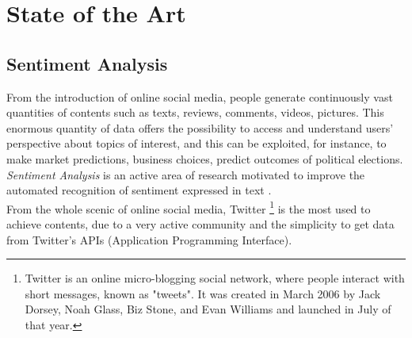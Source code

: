 
\chapter{State of the Art}






\section{Sentiment Analysis}


From the introduction of online social media, people generate continuously vast quantities of contents such as texts, reviews, comments, videos, pictures. This enormous quantity of data offers the possibility to access and understand users' perspective about topics of interest, and this can be exploited, for instance, to make market predictions, business choices, predict outcomes of political elections. \textit{Sentiment Analysis} is an active area of research motivated to improve the automated recognition of sentiment expressed in text \cite{Zimbra:2018:STS:3210372.3185045}.\\
From the whole scenic of online social media, Twitter \footnote[1]{Twitter is an online micro-blogging social network, where people interact with short messages, known as "tweets". It was created in March 2006 by Jack Dorsey, Noah Glass, Biz Stone, and Evan Williams and launched in July of that year.} is the most used to achieve contents, due to a very active community and the simplicity to get data from Twitter's APIs (Application Programming Interface). 
